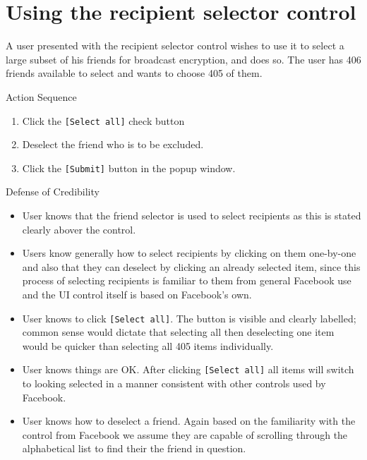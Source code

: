 \section{Using the recipient selector control}
A user presented with the recipient selector control wishes to use it to select a large subset of his friends for broadcast encryption, and does so. The user has 406 friends available to select and wants to choose 405 of them.

\begin{desc}

    \item[Action Sequence] \hfill
    \begin{enumerate}
        \item Click the {\tt [Select all]} check button
        \item Deselect the friend who is to be excluded.
        \item Click the {\tt [Submit]} button in the popup window.
    \end{enumerate}
    
    \item[Defense of Credibility] \hfill
        \begin{itemize}
            
            \item User knows that the friend selector is used to select recipients as this is stated clearly abover the control.
            
            \item Users know generally how to select recipients by clicking on them one-by-one and also that they can deselect by clicking an already selected item, since this process of selecting recipients is familiar to them from general Facebook use and the UI control itself is based on Facebook's own. 
            
            \item User knows to click {\tt [Select all]}. The button is visible and clearly labelled; common sense would dictate that selecting all then deselecting one item would be quicker than selecting all 405 items individually.
            
            \item User knows things are OK. After clicking {\tt [Select all]} all items will switch to looking selected in a manner consistent with other controls used by Facebook.
            
            \item User knows how to deselect a friend. Again based on the familiarity with the control from Facebook we assume they are capable of scrolling through the alphabetical list to find their the friend in question.
            

\end{itemize}
\end{desc}
